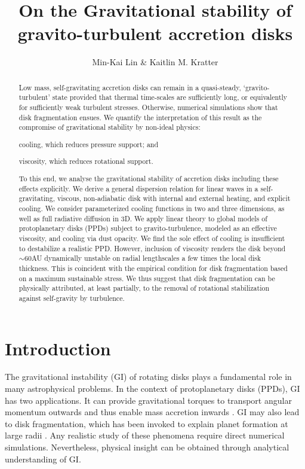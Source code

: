\documentclass[iop, numberedappendix]{emulateapj}
\begin{document}
\title{On the Gravitational stability of gravito-turbulent accretion disks}
\author{Min-Kai Lin \& Kaitlin M. Kratter}

\begin{abstract}
Low mass, self-gravitating accretion disks can remain in a  
quasi-steady, `gravito-turbulent' state provided that thermal 
time-scales are sufficiently long, or equivalently for sufficiently
weak turbulent stresses. Otherwise, numerical simulations show that
disk fragmentation ensues. 
We quantify the interpretation of this result as the
compromise of gravitational stability by non-ideal physics: 
\begin{inparaenum}[1)] 
\item cooling, which reduces pressure support; and
\item viscosity, which reduces rotational support. 
\end{inparaenum}
To this end, we analyse the gravitational stability of accretion disks
including these effects explicitly.   
We derive a general dispersion relation for linear waves in a 
self-gravitating, viscous, non-adiabatic disk with internal and
external heating, and explicit cooling. We 
consider parameterized cooling functions in two and three dimensions,
as well as full radiative diffusion in 3D. 
We apply linear theory to 
global models of protoplanetary disks (PPDs) subject to gravito-turbulence, modeled as an effective
viscosity, and cooling via dust opacity. We find the sole effect of cooling is insufficient to
destabilize a realistic PPD. However, inclusion of viscosity renders
the disk beyond $\sim 60$AU dynamically unstable on radial 
lengthscales a few times the local disk thickness. This is coincident 
with the empirical condition for disk fragmentation based on a
maximum sustainable stress. We 
thus suggest that disk fragmentation can be physically attributed, 
at least partially, to the removal of rotational stabilization against
self-gravity by turbulence.   
\end{abstract}



\section{Introduction}\label{intro} 
The gravitational instability (GI) of rotating disks   
plays a fundamental role in many astrophysical problems. In the context of 
protoplanetary disks (PPDs), GI has two applications. It can 
provide gravitational torques to transport angular momentum outwards
and thus enable mass accretion inwards \citep{armitage10,turner14}.   
GI may also lead to disk fragmentation, which has been invoked to explain planet formation at
large radii \citep{helled14}. Any realistic study of these phenomena require direct
numerical simulations. Nevertheless, physical insight can be  
obtained through analytical understanding of GI.  %
\end{document}
